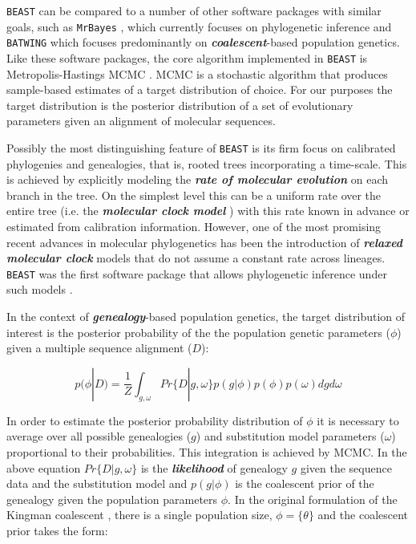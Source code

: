 \documentclass[cup7b, english]{cupbook}
\begin{document}
\texttt{BEAST} can be compared to a number of other software packages with
similar goals, such as \texttt{MrBayes} \cite{HR2001}, which
currently focuses on phylogenetic inference and \texttt{BATWING}
\cite{WWB2003} which focuses predominantly on \textbf{\textit{coalescent}}-based population
genetics. Like these software packages, the core algorithm implemented
in \texttt{BEAST} is Metropolis-Hastings MCMC \cite{MRRTT1953,Hastings1970}.
MCMC is a stochastic algorithm that produces sample-based estimates
of a target distribution of choice. For our purposes the target distribution
is the posterior distribution of a set of evolutionary parameters
given an alignment of molecular sequences.

Possibly the most distinguishing feature of \texttt{BEAST} is its firm focus
on calibrated phylogenies and genealogies, that is, rooted trees incorporating
a time-scale. This is achieved by explicitly modeling the \textbf{\textit{rate of
molecular evolution}} on each branch in the tree. On the simplest level
this can be a uniform rate over the entire tree (i.e. the \textbf{\textit{molecular
clock model}} \cite{ZP1965}) with this rate known in advance or estimated
from calibration information. However, one of the most promising recent
advances in molecular phylogenetics has been the introduction of \textbf{\textit{relaxed
molecular clock}} models that do not assume a constant rate across
lineages\cite{TKP1998,YY2000,KTB2001,Sanderson2002,TK2002,AY2003}.
\texttt{BEAST} was the first software package that allows phylogenetic inference
under such models \cite{DHPR2006}.

In the context of \textbf{\textit{genealogy}}-based population genetics, the target distribution of interest
is the posterior probability of the the population genetic parameters ($\phi$) given a
multiple sequence alignment ($D$):

\begin{equation}
p(\phi|D) = \frac{1}{Z}\int_{g,\omega} Pr\{D|g, \omega\}p(g|\phi)p(\phi)p(\omega)dgd\omega
\label{posterior-phi}
\end{equation}

In order to estimate the posterior probability distribution of $\phi$ it is necessary to average
over all possible genealogies ($g$) and substitution model parameters ($\omega$)
proportional to their probabilities. This integration is achieved by MCMC. In the above equation
$Pr\{D|g, \omega\}$ is the \textbf{\textit{likelihood}} of genealogy $g$ given the sequence data and the
substitution model \cite{F81} and $p(g|\phi)$ is the coalescent
prior of the genealogy given the population parameters $\phi$. In the original formulation
of the Kingman coalescent \cite{Kingman1982}, there is a single population size, $\phi = \{\theta\}$ and the
coalescent prior takes the form:
\end{document}

